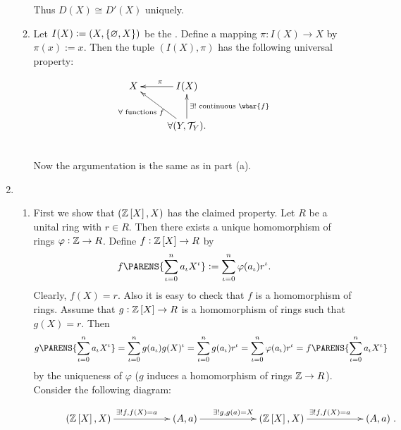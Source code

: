 \begin{enumerate}[label = \textbf{Exercise \arabic*.},wide = 0pt, itemsep=1.5ex]
\begin{enumerate}[label = \textup{(}\alph*\textup{)}]
\begin{equation*}
				\end{equation*}
				Thus $D(X) \cong D'(X)$ uniquely.
			\item Let $I(X) := (X,\cbr[0]{\varnothing,X})$ be the . Define a mapping $\pi : I(X) \to X$ by $\pi(x) := x$. Then the tuple $(I(X),\pi)$ has the following universal property:
				\begin{figure}[h!tb]
					\begin{displaymath}
						\xymatrix{X & I(X) \ar[l]_\pi \\
						 & \forall (Y,\Tcal_Y). \ar[ul]^{\forall \text{ functions } f}\ar[u]_{\exists ! \text{ continuous } \wbar{f}}}
					\end{displaymath}
				\end{figure}\\
				Now the argumentation is the same as in part (a).
		\end{enumerate}
	\item ~
		\begin{enumerate}[label = \textup{(}\alph*\textup{)}]
			\item First we show that $(\Zbb\sbr[0]{X},X)$ has the claimed property. Let $R$ be a unital ring with $r \in R$. Then there exists a unique homomorphism of rings $\varphi : \mathbb{Z} \to R$. Define $f : \Zbb\sbr[0]{X} \to R$ by 
				\begin{equation*}
					f\PARENS{\sum_{\iota = 0}^n a_\iota X^\iota} := \sum_{\iota = 0}^n \varphi(a_\iota)r^\iota.
				\end{equation*}
				Clearly, $f(X) = r$. Also it is easy to check that $f$ is a homomorphism of rings. Assume that $g : \Zbb\sbr[0]{X} \to R$ is a homomorphism of rings such that $g(X) = r$. Then
				\begin{equation*}
					g\PARENS{\sum_{\iota = 0}^n a_\iota X^\iota} = \sum_{\iota = 0}^n g(a_\iota)g(X)^\iota = \sum_{\iota = 0}^n g(a_\iota)r^\iota = \sum_{\iota = 0}^n \varphi(a_\iota)r^\iota = f\PARENS{\sum_{\iota = 0}^n a_\iota X^\iota}
				\end{equation*}
				\noindent by the uniqueness of $\varphi$ ($g$ induces a homomorphism of rings $\mathbb{Z} \to R$). Consider the following diagram:
				\begin{figure}[h!tb]
					\begin{displaymath}
						\xymatrixcolsep{2cm}\xymatrix{(\Zbb\sbr[0]{X},X) \ar[r]^{\exists ! f, f(X) = a } & (A,a) \ar[r]^{\exists ! g, g(a) = X} & (\Zbb\sbr[0]{X},X) \ar[r]^{\exists ! f, f(X) = a } & (A,a)}.
					\end{displaymath}	

\end{figure}
\end{enumerate}
\end{enumerate}
